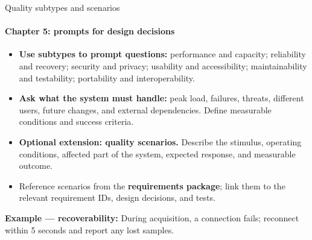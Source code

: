 \begin{frame}{Quality subtypes and scenarios}
\framesubtitle{Chapter 5: prompts for design decisions}
\begin{itemize}
  \item \textbf{Use subtypes to prompt questions:} performance and capacity; reliability and recovery; security and privacy; usability and accessibility; maintainability and testability; portability and interoperability.
  \item \textbf{Ask what the system must handle:} peak load, failures, threats, different users, future changes, and external dependencies. Define measurable conditions and success criteria.
  \item \textbf{Optional extension: quality scenarios.} Describe the stimulus, operating conditions, affected part of the system, expected response, and measurable outcome.
  \item Reference scenarios from the \textbf{requirements package}; link them to the relevant requirement IDs, design decisions, and tests.
\end{itemize}
\vspace{0.1cm}
{\small\textbf{Example --- recoverability:} During acquisition, a connection fails; reconnect within 5 seconds and report any lost samples.}
\end{frame}
